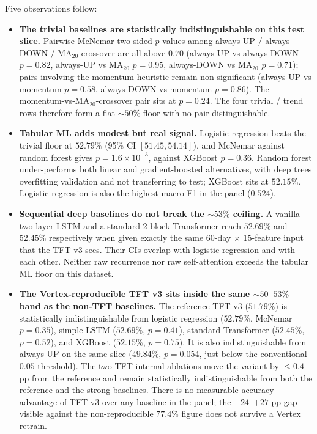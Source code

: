 \documentclass[conference]{IEEEtran}
\begin{document}
Five observations follow:
\begin{itemize}
\item \textbf{The trivial baselines are statistically indistinguishable on this test slice.} Pairwise McNemar two-sided $p$-values among always-UP / always-DOWN / MA$_{20}$ crossover are all above $0.70$ (always-UP vs always-DOWN $p = 0.82$, always-UP vs MA$_{20}$ $p = 0.95$, always-DOWN vs MA$_{20}$ $p = 0.71$); pairs involving the momentum heuristic remain non-significant (always-UP vs momentum $p = 0.58$, always-DOWN vs momentum $p = 0.86$). The momentum-vs-MA$_{20}$-crossover pair sits at $p = 0.24$. The four trivial / trend rows therefore form a flat $\sim 50\%$ floor with no pair distinguishable.
\item \textbf{Tabular ML adds modest but real signal.} Logistic regression beats the trivial floor at $52.79\%$ (95\% CI $[51.45, 54.14]$), and McNemar against random forest gives $p = 1.6 \times 10^{-3}$, against XGBoost $p = 0.36$. Random forest under-performs both linear and gradient-boosted alternatives, with deep trees overfitting validation and not transferring to test; XGBoost sits at $52.15\%$. Logistic regression is also the highest macro-F1 in the panel ($0.524$).
\item \textbf{Sequential deep baselines do not break the $\sim 53\%$ ceiling.} A vanilla two-layer LSTM and a standard 2-block Transformer reach $52.69\%$ and $52.45\%$ respectively when given exactly the same 60-day $\times$ 15-feature input that the TFT v3 sees. Their CIs overlap with logistic regression and with each other. Neither raw recurrence nor raw self-attention exceeds the tabular ML floor on this dataset.
\item \textbf{The Vertex-reproducible TFT v3 sits inside the same $\sim 50$--$53\%$ band as the non-TFT baselines.} The reference TFT v3 ($51.79\%$) is statistically indistinguishable from logistic regression ($52.79\%$, McNemar $p = 0.35$), simple LSTM ($52.69\%$, $p = 0.41$), standard Transformer ($52.45\%$, $p = 0.52$), and XGBoost ($52.15\%$, $p = 0.75$). It is also indistinguishable from always-UP on the same slice ($49.84\%$, $p = 0.054$, just below the conventional $0.05$ threshold). The two TFT internal ablations move the variant by $\leq 0.4$ pp from the reference and remain statistically indistinguishable from both the reference and the strong baselines. There is no measurable accuracy advantage of TFT v3 over any baseline in the panel; the $+24$--$+27$ pp gap visible against the non-reproducible $77.4\%$ figure does not survive a Vertex retrain.

\end{itemize}
\end{document}
